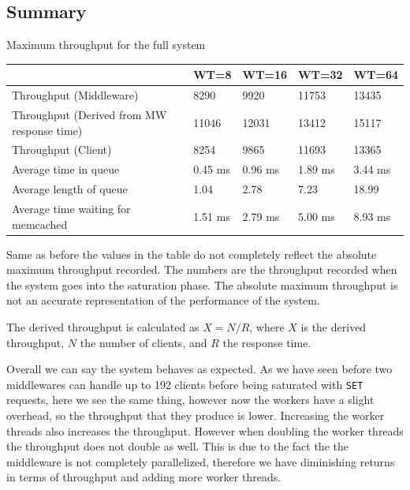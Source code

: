 \documentclass[11pt,a4paper]{article}
\begin{document}
\subsection{Summary}
%
\begin{center}
	{Maximum throughput for the full system}
	\begin{tabular}{|l|p{1.5cm}|p{1.5cm}|p{1.5cm}|p{1.5cm}|}
		\hline                                            & WT=8 & WT=16 & WT=32 & WT=64 \\ 
		\hline Throughput (Middleware)                    &  8290    &  9920    &   11753   &   13435   \\ 
		\hline Throughput (Derived from MW response time) &  11046   &  12031   &   13412   &   15117   \\ 
		\hline Throughput (Client)                        &  8254    &  9865    &   11693   &   13365   \\ 
		\hline Average time in queue                      &  0.45 ms &  0.96 ms &   1.89 ms &   3.44 ms \\ 
		\hline Average length of queue                    &  1.04    &  2.78    &   7.23    &   18.99   \\ 
		\hline Average time waiting for memcached         &  1.51 ms &  2.79 ms &   5.00 ms &   8.93 ms \\ 
		\hline 
	\end{tabular}
	\label{max_tp_table}
\end{center}
%
Same as before the values in the table do not completely reflect the absolute maximum throughput recorded.
%
The numbers are the throughput recorded when the system goes into the saturation phase.
%
The absolute maximum throughput is not an accurate representation of the performance of the system.
%
\par
%
The derived throughput is calculated as $X = N / R$, where $X$ is the derived throughput, $N$ the number of clients, and $R$ the response time.
%
\par
%
Overall we can say the system behaves as expected.
%
As we have seen before two middlewares can handle up to 192 clients before being saturated with \texttt{SET} requests, here we see the same thing, however now the workers have a slight overhead, so the throughput that they produce is lower.
%
Increasing the worker threads also increases the throughput.
%
However when doubling the worker threads the throughput does not double as well.
%
This is due to the fact the the middleware is not completely parallelized, therefore we have diminishing returns in terms of throughput and adding more worker threads.
\end{document}
